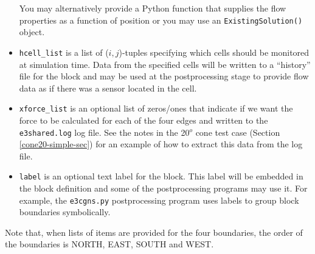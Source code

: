 \begin{itemize}
  You may alternatively provide a Python function that supplies the flow properties as
  a function of position or you may use an \texttt{ExistingSolution()} object.
\item \texttt{hcell\_list} is a list of ($i,j$)-tuples specifying which
  cells should be monitored at simulation time.
  Data from the specified cells will be written to a ``history'' file for the
  block and may be used at the postprocessing stage to provide flow data as if
  there was a sensor located in the cell.
\item \texttt{xforce\_list} is an optional list of zeros/ones that indicate if we
  want the force to be calculated for each of the four edges and written to the 
  \texttt{e3shared.log} log file.
  See the notes in the 20$^o$ cone test case (Section\,\ref{cone20-simple-sec}) for an
  example of how to extract this data from the log file. 
\item \texttt{label} is an optional text label for the block.  This label
  will be embedded in the block definition and some of the postprocessing
  programs may use it.
  For example, the \texttt{e3cgns.py} postprocessing program uses labels to group block boundaries symbolically.
\end{itemize}
Note that, when lists of items are provided for the four boundaries,
the order of the boundaries is NORTH, EAST, SOUTH and WEST.
 

